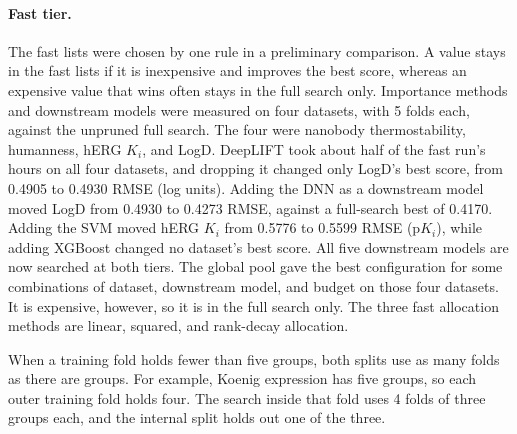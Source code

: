\paragraph{Fast tier.}
The fast lists were chosen by one rule in a preliminary comparison. A value stays in the fast lists if it is inexpensive and improves the best score, whereas an expensive value that wins often stays in the full search only. Importance methods and downstream models were measured on four datasets, with 5 folds each, against the unpruned full search. The four were nanobody thermostability, humanness, hERG $K_i$, and LogD. DeepLIFT took about half of the fast run's hours on all four datasets, and dropping it changed only LogD's best score, from 0.4905 to 0.4930 RMSE (log units). Adding the DNN as a downstream model moved LogD from 0.4930 to 0.4273 RMSE, against a full-search best of 0.4170. Adding the SVM moved hERG $K_i$ from 0.5776 to 0.5599 RMSE (p$K_i$), while adding XGBoost changed no dataset's best score. All five downstream models are now searched at both tiers. The global pool gave the best configuration for some combinations of dataset, downstream model, and budget on those four datasets. It is expensive, however, so it is in the full search only. The three fast allocation methods are linear, squared, and rank-decay allocation.



\label{app:add:fold_counts}
When a training fold holds fewer than five groups, both splits use as many folds as there are groups. For example, Koenig expression has five groups, so each outer training fold holds four. The search inside that fold uses 4 folds of three groups each, and the internal split holds out one of the three.


